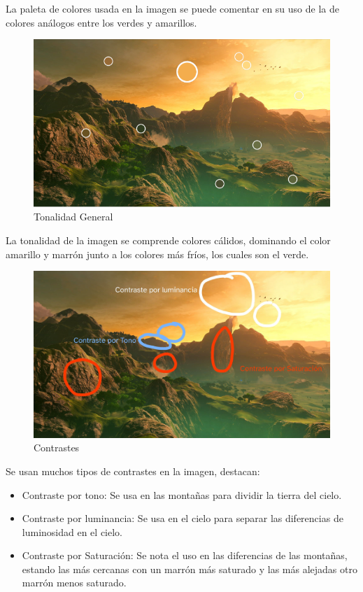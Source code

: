 \documentclass[12pt]{article}
\begin{document}
          La paleta de colores usada en la imagen se puede comentar en su uso de la de colores análogos entre los verdes y amarillos.

          \begin{figure}[H]
            \centering
            \includegraphics[width=\textwidth]{images/Jesus/Seccion16/Tonalidad.png}
            \caption{Tonalidad General}
          \end{figure} 

          La tonalidad de la imagen se comprende colores cálidos, dominando el color amarillo y marrón junto a los colores más fríos, los cuales son el verde.

          \begin{figure}[H]
            \centering
            \includegraphics[width=\textwidth]{Jesus/Seccion16/Contrastes.jpg}
            \caption{Contrastes}
          \end{figure} 

          Se usan muchos tipos de contrastes en la imagen, destacan: 
          \begin{itemize}
            \item Contraste por tono: Se usa en las montañas para dividir la tierra del cielo.
            \item Contraste por luminancia: Se usa en el cielo para separar las diferencias de luminosidad en el cielo. 
            \item Contraste por Saturación: Se nota el uso en las diferencias de las montañas, estando las más cercanas con un marrón más saturado y las más alejadas otro marrón menos saturado.
          \end{itemize}
          
\end{document}
